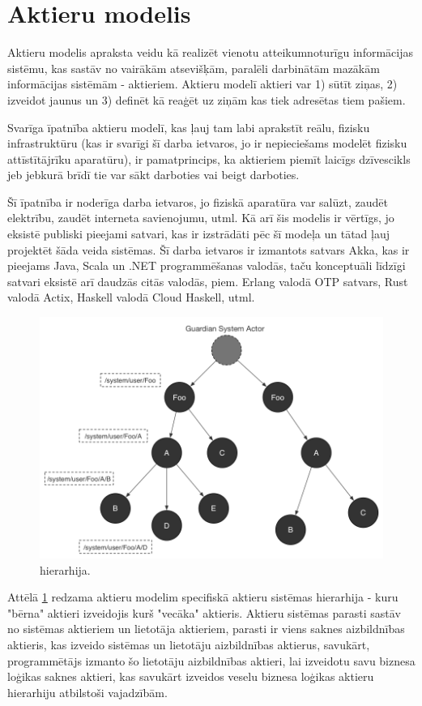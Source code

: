 \section{Aktieru modelis}

Aktieru modelis apraksta veidu kā realizēt vienotu atteikumnoturīgu informācijas
sistēmu, kas sastāv no vairākām atsevišķām, paralēli darbinātām mazākām
informācijas sistēmām - aktieriem. Aktieru modelī aktieri var 1) sūtīt ziņas, 2)
izveidot jaunus  un 3) definēt kā reaģēt uz ziņām kas
tiek adresētas tiem pašiem. \cite[p. 1]{CarlHewitt2010}

Svarīga īpatnība aktieru modelī, kas ļauj tam labi aprakstīt reālu, fizisku
infrastruktūru (kas ir svarīgi šī darba ietvaros, jo ir nepieciešams modelēt
fizisku attīstītājrīku aparatūru), ir pamatprincips, ka aktieriem piemīt laicīgs
dzīvescikls jeb jebkurā brīdī tie var sākt darboties vai beigt darboties.
\cite[p. 6]{CarlHewitt2010} 
 
Šī īpatnība ir noderīga darba ietvaros, jo fiziskā aparatūra var salūzt, zaudēt
elektrību, zaudēt interneta savienojumu, utml. Kā arī šis modelis ir vērtīgs, jo
eksistē publiski pieejami satvari, kas ir izstrādāti pēc šī modeļa un tātad ļauj
projektēt šāda veida sistēmas. Šī darba ietvaros ir izmantots satvars Akka, kas
ir pieejams Java, Scala un .NET programmēšanas valodās, taču konceptuāli līdzīgi
satvari eksistē arī daudzās citās valodās, piem. Erlang valodā OTP satvars, Rust
valodā Actix, Haskell valodā Cloud Haskell, utml.

\begin{figure}[H]
    \includegraphics[width=0.5\linewidth]{assets/akka-actor-hierarchy-gray.png}
    \centering
    \caption{ hierarhija.
    \cite[sl. 34]{MarkusJuraAkka}}
    \label{fig:actorsystem}
\end{figure}

Attēlā \ref{fig:actorsystem} redzama aktieru modelim specifiskā aktieru sistēmas
hierarhija - kuru "bērna" aktieri izveidojis kurš "vecāka" aktieris. Aktieru
sistēmas parasti sastāv no sistēmas aktieriem un lietotāja aktieriem, parasti ir
viens saknes aizbildnības aktieris, kas izveido sistēmas un lietotāju
aizbildnības aktierus, savukārt, programmētājs izmanto šo lietotāju aizbildnības
aktieri, lai izveidotu savu biznesa loģikas saknes aktieri, kas savukārt
izveidos veselu biznesa loģikas aktieru hierarhiju atbilstoši vajadzībām.
\cite[para. The Akka actor hierarchy]{LightbendAkka2619}


